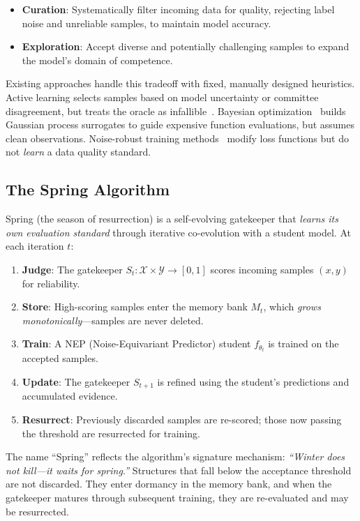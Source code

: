 \documentclass[11pt,a4paper]{article}
\theoremstyle{plain}
\theoremstyle{definition}
\theoremstyle{remark}
\newcommand{\X}{\mathcal{X}}
\newcommand{\Y}{\mathcal{Y}}
\begin{document}
\begin{itemize}[nosep]
    \item \textbf{Curation}: Systematically filter incoming data for quality, rejecting label noise and unreliable samples, to maintain model accuracy.
    \item \textbf{Exploration}: Accept diverse and potentially challenging samples to expand the model's domain of competence.
\end{itemize}

Existing approaches handle this tradeoff with fixed, manually designed heuristics. Active learning selects samples based on model uncertainty or committee disagreement, but treats the oracle as infallible~\citep{settles2009}. Bayesian optimization~\citep{srinivas2010} builds Gaussian process surrogates to guide expensive function evaluations, but assumes clean observations. Noise-robust training methods~\citep{natarajan2013} modify loss functions but do not \emph{learn} a data quality standard.

\subsection{The Spring Algorithm}

Spring (the season of resurrection) is a self-evolving gatekeeper that \emph{learns its own evaluation standard} through iterative co-evolution with a student model. At each iteration $t$:

\begin{enumerate}[nosep]
    \item \textbf{Judge}: The gatekeeper $S_t: \X \times \Y \to [0,1]$ scores incoming samples $(x, y)$ for reliability.
    \item \textbf{Store}: High-scoring samples enter the memory bank $M_t$, which \emph{grows monotonically}---samples are never deleted.
    \item \textbf{Train}: A NEP (Noise-Equivariant Predictor) student $f_{\theta_t}$ is trained on the accepted samples.
    \item \textbf{Update}: The gatekeeper $S_{t+1}$ is refined using the student's predictions and accumulated evidence.
    \item \textbf{Resurrect}: Previously discarded samples are re-scored; those now passing the threshold are resurrected for training.
\end{enumerate}

The name ``Spring'' reflects the algorithm's signature mechanism: \emph{``Winter does not kill---it waits for spring.''} Structures that fall below the acceptance threshold are not discarded. They enter dormancy in the memory bank, and when the gatekeeper matures through subsequent training, they are re-evaluated and may be resurrected.
\end{document}
